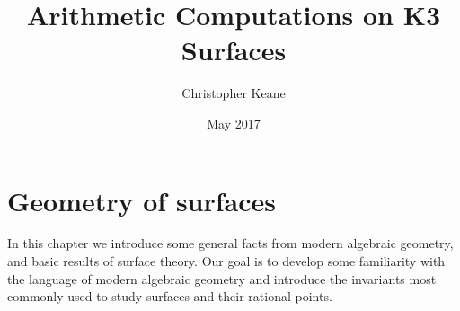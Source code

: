 \documentclass[12pt,twoside]{reedthesis}
\title{Arithmetic Computations on K3 Surfaces}
\author{Christopher Keane}
\date{May 2017}
\theoremstyle{plain}
\theoremstyle{definition}
\theoremstyle{remark}
\begin{document}
\tableofcontents
\mainmatter 
\pagestyle{fancyplain} 

\chapter{Geometry of surfaces}
In this chapter we introduce some general facts from modern algebraic geometry, and basic results of surface theory. Our goal is to develop some familiarity with the language of modern algebraic geometry and introduce the invariants most commonly used to study surfaces and their rational points.
\end{document}
